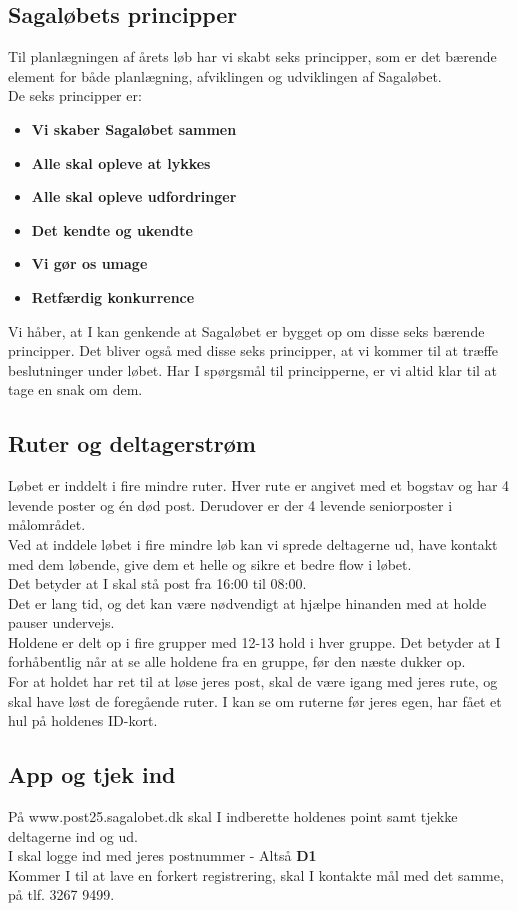 \subsection{Sagaløbets principper}
Til planlægningen af årets løb har vi skabt seks principper, som er det bærende element for både planlægning, afviklingen og udviklingen af Sagaløbet.\\
De seks principper er:
\begin{itemize}
  \item \textbf{Vi skaber Sagaløbet sammen}
  \item \textbf{Alle skal opleve at lykkes}
  \item \textbf{Alle skal opleve udfordringer}
  \item \textbf{Det kendte og ukendte}
  \item \textbf{Vi gør os umage}
  \item \textbf{Retfærdig konkurrence}
\end{itemize}
Vi håber, at I kan genkende at Sagaløbet er bygget op om disse seks bærende principper. Det bliver også med disse seks principper, at vi kommer til at træffe beslutninger under løbet. Har I spørgsmål til principperne, er vi altid klar til at tage en snak om dem.
\subsection{Ruter og deltagerstrøm}
Løbet er inddelt i fire mindre ruter. Hver rute er angivet med et bogstav og har 4 levende poster og én død post. Derudover er der 4 levende seniorposter i målområdet.\\
Ved at inddele løbet i fire mindre løb kan vi sprede deltagerne ud, have kontakt med dem løbende, give dem et helle og sikre et bedre flow i løbet.\\
\newline
Det betyder at I skal stå post fra 16:00 til 08:00.\\
Det er lang tid, og det kan være nødvendigt at hjælpe hinanden med at holde pauser undervejs.\\
\newline
Holdene er delt op i fire grupper med 12-13 hold i hver gruppe. Det betyder at I forhåbentlig når at se alle holdene fra en gruppe, før den næste dukker op.\\
For at holdet har ret til at løse jeres post, skal de være igang med jeres rute, og skal have løst de foregående ruter. I kan se om ruterne før jeres egen, har fået et hul på holdenes ID-kort.
\subsection{App og tjek ind}
På www.post25.sagalobet.dk skal I indberette holdenes point samt tjekke deltagerne ind og ud.\\
I skal logge ind med jeres postnummer - Altså \textbf{D1}\\
\newline
Kommer I til at lave en forkert registrering, skal I kontakte mål med det samme, på tlf. 3267 9499.
\newpage
\vspace*{.4cm}
